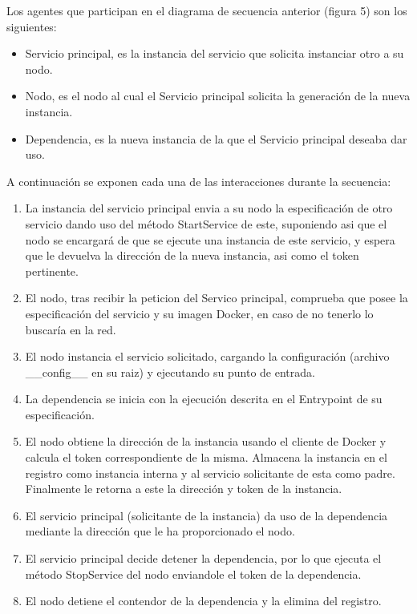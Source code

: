 \documentclass[11pt]{article}
\begin{document}
				Los agentes que participan en el diagrama de secuencia anterior (figura 5) son los siguientes:
				\begin{itemize}
					\item Servicio principal, es la instancia del servicio que solicita instanciar otro a su nodo.
					\item Nodo, es el nodo al cual el Servicio principal solicita la generación de la nueva instancia.
					\item Dependencia, es la nueva instancia de la que el Servicio principal deseaba dar uso.
				\end{itemize}

				A continuación se exponen cada una de las interacciones durante la secuencia:
				\begin{enumerate}
					\item La instancia del servicio principal envia a su nodo la especificación de otro servicio dando uso del método StartService de este, suponiendo asi que el nodo
						se encargará de que se ejecute una instancia de este servicio, y espera que le devuelva la dirección de la nueva instancia, asi como el token pertinente.
					\item El nodo, tras recibir la peticion del Servico principal, comprueba que posee la especificación del servicio y su imagen Docker, en caso de no tenerlo lo buscaría en la red. 
					\item El nodo instancia el servicio solicitado, cargando la configuración (archivo \_\_config\_\_ en su raiz) y ejecutando su punto de entrada.
					\item La dependencia se inicia con la ejecución descrita en el Entrypoint de su especificación.
					\item El nodo obtiene la dirección de la instancia usando el cliente de Docker y calcula el token correspondiente de la misma. Almacena la instancia en el registro como instancia interna
						y al servicio solicitante de esta como padre. Finalmente le retorna a este la dirección y token de la instancia.
					\item El servicio principal (solicitante de la instancia) da uso de la dependencia mediante la dirección que le ha proporcionado el nodo.
					\item El servicio principal decide detener la dependencia, por lo que ejecuta el método StopService del nodo enviandole el token de la dependencia.
					\item El nodo detiene el contendor de la dependencia y la elimina del registro.
				\end{enumerate}
\end{document}
